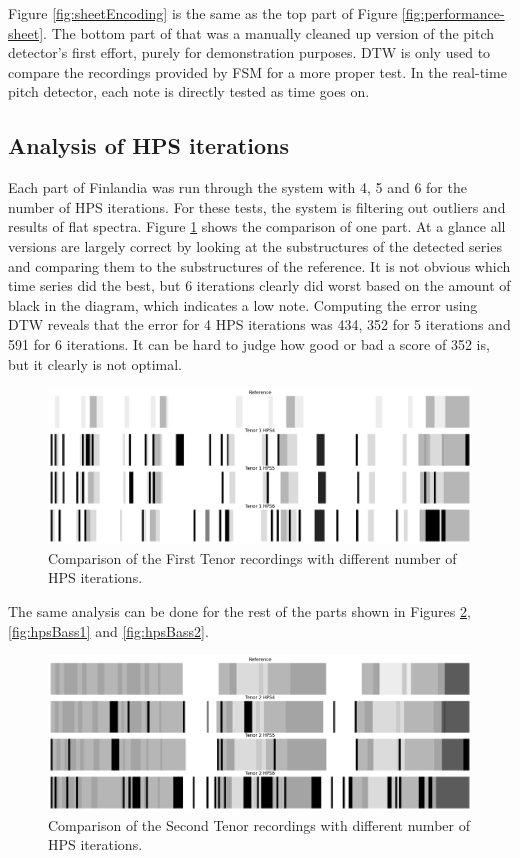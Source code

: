 Figure \ref{fig:sheetEncoding} is the same as the top part of Figure \ref{fig:performance-sheet}. The bottom part of that was a manually cleaned up version of the pitch detector's first effort, purely for demonstration purposes. DTW is only used to compare the recordings provided by FSM for a more proper test. In the real-time pitch detector, each note is directly tested as time goes on.

\subsection{Analysis of HPS iterations}
Each part of Finlandia was run through the system with 4, 5 and 6 for the number of HPS iterations. For these tests, the system is filtering out outliers and results of flat spectra. Figure \ref{fig:hpsTenor1} shows the comparison of one part. At a glance all versions are largely correct by looking at the substructures of the detected series and comparing them to the substructures of the reference. It is not obvious which time series did the best, but 6 iterations clearly did worst based on the amount of black in the diagram, which indicates a low note. Computing the error using DTW reveals that the error for 4 HPS iterations was 434, 352 for 5 iterations and 591 for 6 iterations. It can be hard to judge how good or bad a score of 352 is, but it clearly is not optimal.

\begin{figure}[ht]
    \centering
    \includegraphics[width=\textwidth]{./images/hpsTenor1.png}
    \caption{Comparison of the First Tenor recordings with different number of HPS iterations. \label{fig:hpsTenor1}}
\end{figure}

The same analysis can be done for the rest of the parts shown in Figures \ref{fig:hpsTenor2}, \ref{fig:hpsBass1} and \ref{fig:hpsBass2}.

\begin{figure}[ht]
    \centering
    \includegraphics[width=\textwidth]{./images/hpsTenor2.png}
    \caption{Comparison of the Second Tenor recordings with different number of HPS iterations. \label{fig:hpsTenor2}}
\end{figure}


